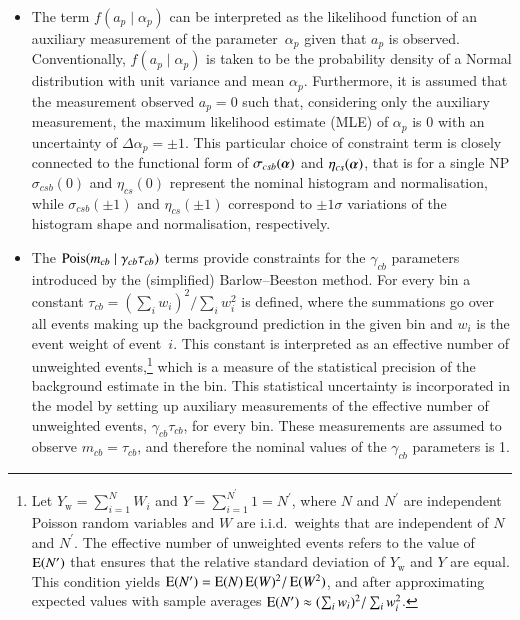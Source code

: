 \begin{itemize}

\item The term $f(a_p \mid \alpha_p)$ can be interpreted as the likelihood
  function of an auxiliary measurement of the parameter~$\alpha_p$ given that
  $a_p$ is observed. Conventionally, $f(a_p \mid \alpha_p)$ is taken to be the
  probability density of a Normal distribution with unit variance and mean
  $\alpha_p$. Furthermore, it is assumed that the measurement observed $a_p = 0$
  such that, considering only the auxiliary measurement, the maximum likelihood
  estimate (MLE) of $\alpha_p$ is 0 with an uncertainty of
  $\Delta \alpha_p = \pm 1$. This particular choice of constraint term is
  closely connected to the functional form of $\sigma_{csb}(\myvec{\alpha})$ and
  $\eta_{cs}(\myvec{\alpha})$, that is for a single NP $\sigma_{csb}(0)$ and
  $\eta_{cs}(0)$ represent the nominal histogram and normalisation, while
  $\sigma_{csb}(\pm 1)$ and $\eta_{cs}(\pm 1)$ correspond to $\pm 1 \sigma$
  variations of the histogram shape and normalisation, respectively.


\item The $\operatorname{Pois}(m_{cb} \mid \gamma_{cb} \tau_{cb})$ terms provide constraints
  for the $\gamma_{cb}$ parameters introduced by the (simplified)
  Barlow--Beeston method. For every bin a constant
  $ \tau_{cb} = ( \sum_i w_i )^2 / \sum_i w_i^2 $ is defined, where the
  summations go over all events making up the background prediction in the given
  bin and $w_i$ is the event weight of event~$i$. This constant is interpreted
  as an effective number of unweighted events,\footnote{Let
    $Y_{\text{w}} = \sum_{i = 1}^{N} W_i$ and
    $Y = \sum_{i = 1}^{N^\prime} 1 = N^\prime$, where $N$ and $N^\prime$ are
    independent Poisson random variables and $W$ are i.i.d.\ weights that are
    independent of $N$ and $N^\prime$. The effective number of unweighted events
    refers to the value of $\operatorname{E}(N^\prime)$ that ensures that the relative
    standard deviation of $Y_{\text{w}}$ and $Y$ are equal. This condition
    yields $\operatorname{E}(N^\prime) = \operatorname{E}(N) \operatorname{E}(W)^2 / \operatorname{E}(W^2)$, and
    after approximating expected values with sample averages
    $\operatorname{E}(N^\prime) \approx ( \sum_i w_i )^2 / \sum_i w_i^2$.} which is a
  measure of the statistical precision of the background estimate in the
  bin. This statistical uncertainty is incorporated in the model by setting up
  auxiliary measurements of the effective number of unweighted events,
  $\gamma_{cb}\tau_{cb}$, for every bin. These measurements are assumed to
  observe $m_{cb} = \tau_{cb}$, and therefore the nominal values of the
  $\gamma_{cb}$ parameters is 1.
\end{itemize}
%
%

